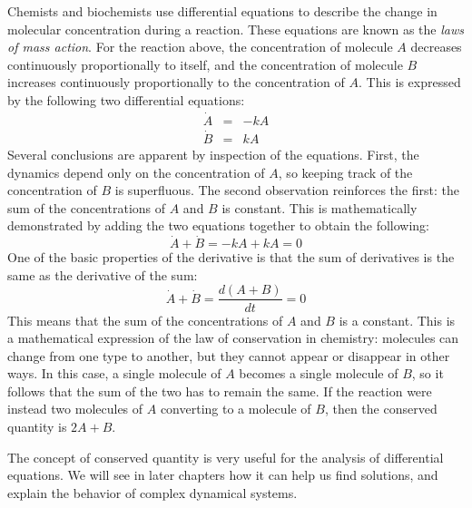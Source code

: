 \documentclass[11pt]{book}
\begin{document}
Chemists and biochemists use differential equations to describe the change in molecular concentration during a reaction. These equations are known as the \emph{laws of mass action}. For the reaction above, the concentration of molecule $A$ decreases continuously proportionally to itself, and the concentration of molecule $B$ increases continuously proportionally to the concentration of $A$. This is expressed by the following two differential equations:
\begin{eqnarray}
\label{eq:lin_chem_kin}
\dot A &=& - k A \\
\dot B &=& kA
\end{eqnarray}
Several conclusions are apparent by inspection of the equations. First, the dynamics depend only on the concentration of $A$, so keeping track of the concentration of $B$ is superfluous. The second observation reinforces the first: the sum of the concentrations of $A$ and $B$ is constant. This is mathematically demonstrated by adding the two equations together to obtain the following:
$$ \dot A + \dot B = -kA + kA = 0$$
One of the basic properties of the derivative is that the sum of derivatives is the same as the derivative of the sum:
$$\dot A + \dot B = \frac{d(A+B)}{dt} = 0$$
This means that the sum of the concentrations of $A$ and $B$ is a constant. This is a mathematical expression of the law of conservation in chemistry: molecules can change from one type to another, but they cannot appear or disappear in other ways. In this case, a single molecule of $A$ becomes a single molecule of $B$, so it follows that the sum of the two has to remain the same. If the reaction were instead two molecules of $A$ converting to a molecule of $B$, then the conserved quantity is $2A + B$.

The concept of conserved quantity is very useful for the analysis of differential equations. We will see in later chapters how it can help us find solutions, and explain the behavior of complex dynamical systems.

\end{document}
